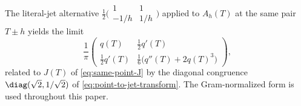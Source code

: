\begin{remark}
\label{rem:normalization-audit}
The literal-jet alternative
\(\tfrac12\bigl(\begin{smallmatrix}1&1\\-1/h&1/h\end{smallmatrix}\bigr)\)
applied to \(A_h(T)\) at the same pair \(T\pm h\) yields the limit
\[
\frac1\pi
\begin{pmatrix}
q(T) & \tfrac12 q'(T)\\[0.6ex]
\tfrac12 q'(T) & \tfrac16\bigl(q''(T)+2q(T)^3\bigr)
\end{pmatrix},
\]
related to \(J(T)\) of \eqref{eq:same-point-J} by the diagonal
congruence \(\diag(\sqrt 2, 1/\sqrt 2)\) of
\eqref{eq:point-to-jet-transform}.  The Gram-normalized form is used
throughout this paper.
\end{remark}

